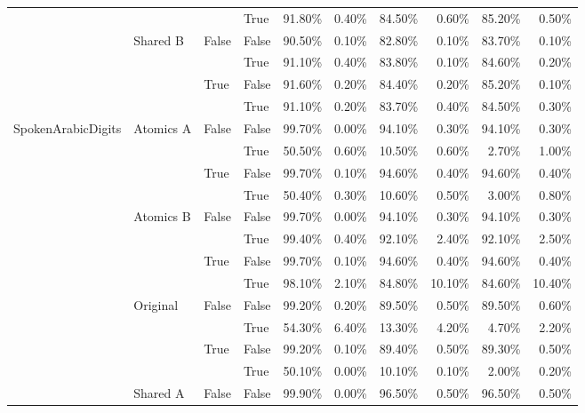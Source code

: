 \begin{table}[h]
\begin{tabular}{llllrrrrrr}
 &  &  & True & 91.80\% & 0.40\% & 84.50\% & 0.60\% & 85.20\% & 0.50\% \\
\cline{2-10} \cline{3-10}
 & \multirow[t]{4}{*}{Shared B} & \multirow[t]{2}{*}{False} & False & 90.50\% & 0.10\% & 82.80\% & 0.10\% & 83.70\% & 0.10\% \\
 &  &  & True & 91.10\% & 0.40\% & 83.80\% & 0.10\% & 84.60\% & 0.20\% \\
\cline{3-10}
 &  & \multirow[t]{2}{*}{True} & False & 91.60\% & 0.20\% & 84.40\% & 0.20\% & 85.20\% & 0.10\% \\
 &  &  & True & 91.10\% & 0.20\% & 83.70\% & 0.40\% & 84.50\% & 0.30\% \\
\cline{1-10} \cline{2-10} \cline{3-10}
\multirow[t]{20}{*}{SpokenArabicDigits} & \multirow[t]{4}{*}{Atomics A} & \multirow[t]{2}{*}{False} & False & 99.70\% & 0.00\% & 94.10\% & 0.30\% & 94.10\% & 0.30\% \\
 &  &  & True & 50.50\% & 0.60\% & 10.50\% & 0.60\% & 2.70\% & 1.00\% \\
\cline{3-10}
 &  & \multirow[t]{2}{*}{True} & False & 99.70\% & 0.10\% & 94.60\% & 0.40\% & 94.60\% & 0.40\% \\
 &  &  & True & 50.40\% & 0.30\% & 10.60\% & 0.50\% & 3.00\% & 0.80\% \\
\cline{2-10} \cline{3-10}
 & \multirow[t]{4}{*}{Atomics B} & \multirow[t]{2}{*}{False} & False & 99.70\% & 0.00\% & 94.10\% & 0.30\% & 94.10\% & 0.30\% \\
 &  &  & True & 99.40\% & 0.40\% & 92.10\% & 2.40\% & 92.10\% & 2.50\% \\
\cline{3-10}
 &  & \multirow[t]{2}{*}{True} & False & 99.70\% & 0.10\% & 94.60\% & 0.40\% & 94.60\% & 0.40\% \\
 &  &  & True & 98.10\% & 2.10\% & 84.80\% & 10.10\% & 84.60\% & 10.40\% \\
\cline{2-10} \cline{3-10}
 & \multirow[t]{4}{*}{Original} & \multirow[t]{2}{*}{False} & False & 99.20\% & 0.20\% & 89.50\% & 0.50\% & 89.50\% & 0.60\% \\
 &  &  & True & 54.30\% & 6.40\% & 13.30\% & 4.20\% & 4.70\% & 2.20\% \\
\cline{3-10}
 &  & \multirow[t]{2}{*}{True} & False & 99.20\% & 0.10\% & 89.40\% & 0.50\% & 89.30\% & 0.50\% \\
 &  &  & True & 50.10\% & 0.00\% & 10.10\% & 0.10\% & 2.00\% & 0.20\% \\
\cline{2-10} \cline{3-10}
 & \multirow[t]{4}{*}{Shared A} & \multirow[t]{2}{*}{False} & False & 99.90\% & 0.00\% & 96.50\% & 0.50\% & 96.50\% & 0.50\% \\

\end{tabular}
\end{table}
